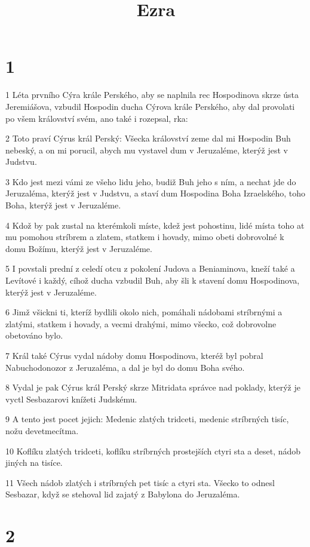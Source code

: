 

\title{Ezra}

\chapter{1}

\par 1 Léta prvního Cýra krále Perského, aby se naplnila rec Hospodinova skrze ústa Jeremiášova, vzbudil Hospodin ducha Cýrova krále Perského, aby dal provolati po všem království svém, ano také i rozepsal, rka:
\par 2 Toto praví Cýrus král Perský: Všecka království zeme dal mi Hospodin Buh nebeský, a on mi porucil, abych mu vystavel dum v Jeruzaléme, kterýž jest v Judstvu.
\par 3 Kdo jest mezi vámi ze všeho lidu jeho, budiž Buh jeho s ním, a nechat jde do Jeruzaléma, kterýž jest v Judstvu, a staví dum Hospodina Boha Izraelského, toho Boha, kterýž jest v Jeruzaléme.
\par 4 Kdož by pak zustal na kterémkoli míste, kdež jest pohostinu, lidé místa toho at mu pomohou stríbrem a zlatem, statkem i hovady, mimo obeti dobrovolné k domu Božímu, kterýž jest v Jeruzaléme.
\par 5 I povstali prední z celedí otcu z pokolení Judova a Beniaminova, kneží také a Levítové i každý, cíhož ducha vzbudil Buh, aby šli k stavení domu Hospodinova, kterýž jest v Jeruzaléme.
\par 6 Jimž všickni ti, kteríž bydlili okolo nich, pomáhali nádobami stríbrnými a zlatými, statkem i hovady, a vecmi drahými, mimo všecko, což dobrovolne obetováno bylo.
\par 7 Král také Cýrus vydal nádoby domu Hospodinova, kteréž byl pobral Nabuchodonozor z Jeruzaléma, a dal je byl do domu Boha svého.
\par 8 Vydal je pak Cýrus král Perský skrze Mitridata správce nad poklady, kterýž je vyctl Sesbazarovi knížeti Judskému.
\par 9 A tento jest pocet jejich: Medenic zlatých tridceti, medenic stríbrných tisíc, nožu devetmecítma.
\par 10 Koflíku zlatých tridceti, koflíku stríbrných prostejších ctyri sta a deset, nádob jiných na tisíce.
\par 11 Všech nádob zlatých i stríbrných pet tisíc a ctyri sta. Všecko to odnesl Sesbazar, když se stehoval lid zajatý z Babylona do Jeruzaléma.

\chapter{2}


